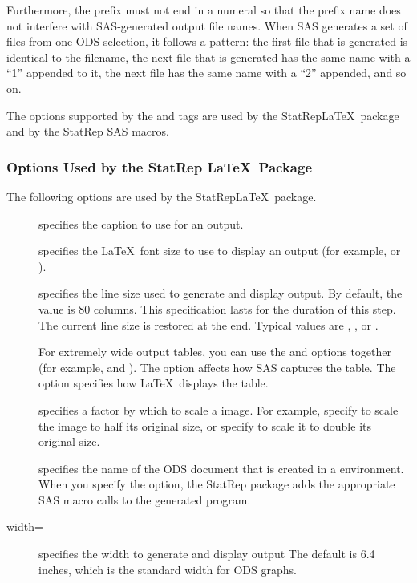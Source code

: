 \documentclass[article,oneside]{memoir}
\newcommand*{\StatRep}{\textsf{StatRep}\xspace}
\begin{document}
     Furthermore, the prefix must not end in a numeral so that the prefix name does not interfere
     with SAS-generated output file names.
    When SAS generates a set of files from one ODS selection, it follows a 
    pattern: the first file that is generated is identical to the filename, the next
    file that is generated has the same name with a ``1'' appended to it, the next file 
    has the same name with a ``2'' appended, and so on.   
     
     The options supported by the  and  tags are used by
     the \StatRep \LaTeX\ package and by the \StatRep SAS macros.
     
     \subsubsection{Options Used by the \textsf{StatRep} \LaTeX\ Package} 
 
  The following options are used by the \StatRep \LaTeX\ package.
  \begin{description}
     \item[] specifies the caption to use for an output.
     
     \item[] specifies the \LaTeX\ font size to use to display an output
    (for example,  or ).

     \item[] specifies the line size used to generate and display
      output. By default, the value is 80 columns. 
     This specification lasts for the duration of this step. The current line size is 
     restored at the end.
     Typical values are , , or .
     
     For extremely wide output tables, you can use the  and 
     options together (for example,  and ). 
     The  option affects how SAS captures the table. The  
     option specifies how \LaTeX\ displays the table.%
    
     \item[] specifies a factor by which to scale a  image. 
     For example, specify  to scale the image to half its original size, 
     or specify  to scale it to double its original size.
 
    \item[] specifies the name of the ODS document that is created in a 
      environment. When you specify the  option,
     the \StatRep package adds the appropriate SAS macro calls to the 
     generated program. 
     
     \item[width=] specifies the width to generate and display  output
           The default is 6.4 inches, which is the standard width for ODS graphs. 

  \end{description}
\end{document}
